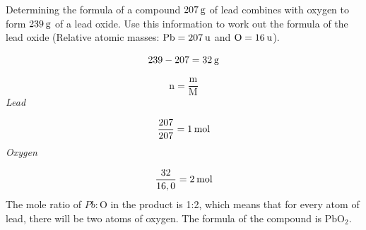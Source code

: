     \noindent
\label{m38712*secfhsst!!!underscore!!!id1235}
      \noindent
      \begin{wex}{Determining the formula of a compound }{
      \label{m38712*probfhsst!!!underscore!!!id1236}
      \label{m38712*id281333}$207\phantom{\rule{2pt}{0ex}}\text{g}$ of lead combines with oxygen to form $239\phantom{\rule{2pt}{0ex}}\text{g}$ of a lead oxide. Use this information to work out the formula of the lead oxide (Relative atomic masses: $\text{Pb}=207\phantom{\rule{2pt}{0ex}}\text{u}$ and $\text{O}=16\phantom{\rule{2pt}{0ex}}\text{u}$).
}
{
      \label{m38712*id281379}\nopagebreak\noindent{}
    \begin{equation*}
    239-207=32\phantom{\rule{2pt}{0ex}}\text{g}
      \end{equation*}
      \label{m38712*id281407}\nopagebreak\noindent{}
        
    \begin{equation*}
    \text{n}=\frac{\text{m}}{\text{M}}
      \end{equation*}
      \label{m38712*id281427}
        \textsl{Lead}
       
      \label{m38712*id281433}\nopagebreak\noindent{}
        
    \begin{equation*}
    \frac{207}{207}=1\phantom{\rule{2pt}{0ex}}\text{mol}
      \end{equation*}
      \label{m38712*id281460}
        \textsl{Oxygen}
    
      \label{m38712*id281467}\nopagebreak\noindent{}
        
    \begin{equation*}
    \frac{32}{16,0}=2\phantom{\rule{2pt}{0ex}}\text{mol}
      \end{equation*}
      \label{m38712*id281498}The mole ratio of $Pb:\text{O}$ in the product is 1:2, which means that for every atom of lead, there will be two atoms of oxygen. The formula of the compound is $\text{PbO}{}_{2}$. 
}
    \end{wex}
    \noindent
\label{m38712*secfhsst!!!underscore!!!id1308} 
      \noindent 
